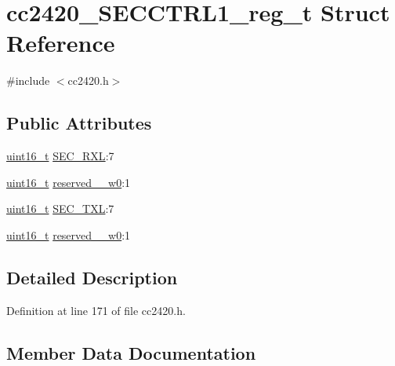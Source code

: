 \hypertarget{structcc2420___s_e_c_c_t_r_l1__reg__t}{}\section{cc2420\+\_\+\+S\+E\+C\+C\+T\+R\+L1\+\_\+reg\+\_\+t Struct Reference}
\label{structcc2420___s_e_c_c_t_r_l1__reg__t}


{\ttfamily \#include $<$cc2420.\+h$>$}

\subsection*{Public Attributes}
\begin{DoxyCompactItemize}
\item 
\hyperlink{_p_e___types_8h_a1f1825b69244eb3ad2c7165ddc99c956}{uint16\+\_\+t} \hyperlink{structcc2420___s_e_c_c_t_r_l1__reg__t_abeb216b3db6b6483699cb27ac85e03f8}{S\+E\+C\+\_\+\+R\+XL}\+:7
\item 
\hyperlink{_p_e___types_8h_a1f1825b69244eb3ad2c7165ddc99c956}{uint16\+\_\+t} \hyperlink{structcc2420___s_e_c_c_t_r_l1__reg__t_a9d8781e5a2ab0b77adddc7e5c5eb58f9}{reserved\+\_\+\_\+w0}\+:1
\item 
\hyperlink{_p_e___types_8h_a1f1825b69244eb3ad2c7165ddc99c956}{uint16\+\_\+t} \hyperlink{structcc2420___s_e_c_c_t_r_l1__reg__t_a4a345d34c173b4c6a50caed741a94b96}{S\+E\+C\+\_\+\+T\+XL}\+:7
\item 
\hyperlink{_p_e___types_8h_a1f1825b69244eb3ad2c7165ddc99c956}{uint16\+\_\+t} \hyperlink{structcc2420___s_e_c_c_t_r_l1__reg__t_a30e756e5151bbaf48d143602b9a6754c}{reserved\+\_\+\_\+w0}\+:1
\end{DoxyCompactItemize}


\subsection{Detailed Description}


Definition at line 171 of file cc2420.\+h.



\subsection{Member Data Documentation}
